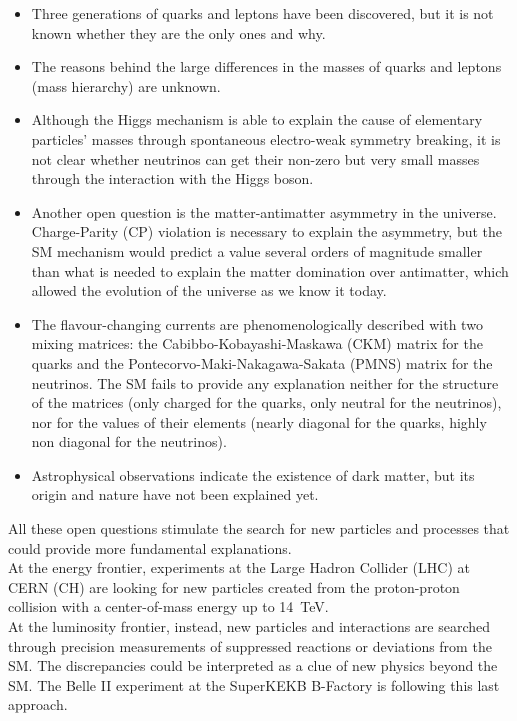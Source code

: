 \begin{itemize}
\item Three generations of quarks and leptons have been discovered, but it is not known whether they are the only ones and why.
\item The reasons behind the large differences in the masses of quarks and leptons (mass hierarchy) are unknown.
\item Although the Higgs mechanism is able to explain the cause of elementary particles' masses through spontaneous electro-weak symmetry breaking, it is not clear whether neutrinos can get their non-zero but very small masses through the interaction with the Higgs boson.
\item Another open question is the matter-antimatter asymmetry in the universe. Charge-Parity (CP) violation is necessary to explain the asymmetry, but the SM mechanism would predict a value several orders of magnitude smaller than what is needed to explain the matter domination over antimatter, which allowed the evolution of the universe as we know it today.
\item The flavour-changing currents are phenomenologically described with two mixing matrices: the Cabibbo-Kobayashi-Maskawa (CKM) matrix for the quarks and the Pontecorvo-Maki-Nakagawa-Sakata (PMNS) matrix for the neutrinos. The SM fails to provide any explanation neither for the structure of the matrices (only charged for the quarks, only neutral for the neutrinos), nor for the values of their elements (nearly diagonal for the quarks, highly non diagonal for the neutrinos).
\item Astrophysical observations indicate the existence of dark matter, but its origin and nature have not been explained yet.
\end{itemize}

All these open questions stimulate the search for new particles and processes that could provide more fundamental explanations.\\
At the energy frontier, experiments at the Large Hadron Collider (LHC) at CERN (CH) are looking for new particles created from the proton-proton collision with a center-of-mass energy up to \SI{14}{TeV}.\\
At the luminosity frontier, instead, new particles and interactions are searched through precision measurements of suppressed reactions or deviations from the SM. The discrepancies could be interpreted as a clue of new physics beyond the SM. The Belle II experiment at the SuperKEKB B-Factory is following this last approach.\\


